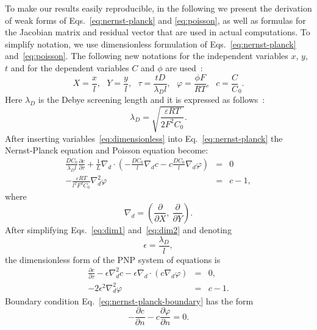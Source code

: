 To make our results easily reproducible, in the following we present the derivation 
of weak forms of Eqs.~\eqref{eq:nernst-planck} and 
\eqref{eq:poisson}, as well as formulas for the Jacobian matrix and residual 
vector that are used in actual computations.
To simplify notation, we use dimensionless formulation of Eqs.~\eqref{eq:nernst-planck}
and~\eqref{eq:poisson}. The following new notations for the independent variables
$x$, $y$, $t$ and for the dependent variables $C$ and $\phi$ are used~\cite{bazant2004diffuse}:
\begin{equation}
  X=\frac xl,\ \ \
  Y=\frac yl,\ \ \
  \tau=\frac{tD}{\lambda_D l},\ \ \
  \varphi=\frac{\phi F}{RT},\ \ \
  c=\frac C C_0.\label{eq:dimensionless}
\end{equation}
Here $\lambda_D$ is the Debye screening length and it is expressed as follows~\cite{bazant2004diffuse}:
\begin{equation}
  \lambda_D=\sqrt{\frac{\varepsilon R T}{2 F^2 C_0}}.\label{eq:debye}
\end{equation}
After inserting variables~\eqref{eq:dimensionless} into Eq.~\eqref{eq:nernst-planck} the Nernst-Planck
equation and Poisson equation become:
\begin{eqnarray}
  \frac{DC_0}{\lambda_D l}\frac{\partial c}{\partial \tau} + \frac 1L \nabla_d\cdot
    \left(-\frac{DC_0}{l}\nabla_dc-c\frac{DC_0}{l}\nabla_d\varphi\right) &=& 0\label{eq:dim1}\\
  - \frac{\varepsilon R T}{l^2F^2C_0}\nabla_d^2\varphi&=&c-1\label{eq:dim2},
\end{eqnarray}
where
\begin{equation}
  \nabla_d=\left(\frac{\partial}{\partial X},\ \frac{\partial}{\partial Y}\right).
\end{equation}
After simplifying Eqs.~\eqref{eq:dim1} and~\eqref{eq:dim2} and denoting
\begin{equation}
  \epsilon=\frac{\lambda_D}{l},
\end{equation}
the dimensionless form of the PNP system of equations is
\begin{eqnarray}
  \frac{\partial c}{\partial \tau}
    -\epsilon\nabla_d^2 c - \epsilon \nabla_d \cdot \left( c\nabla_d \varphi\right)  &=&0,\label{eq:dimensionless-nernst-planck}\\
  -2\epsilon^2\nabla_d^2\varphi&=&c-1\label{eq:dimensionless-poisson}.
\end{eqnarray}
Boundary condition Eq.~\eqref{eq:nernst-planck-boundary} has the form
\begin{equation}
  -\frac{\partial c}{\partial n}-c\frac{\partial\varphi}{\partial n}=0.
  \label{eq:dimensionless-nernst-planck-boundary}
\end{equation}
